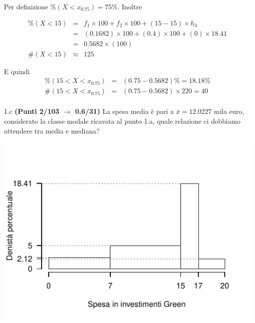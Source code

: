 \documentclass[
  11pt,
]{book}
\theoremstyle{mytheoremstyle}
\theoremstyle{mydefstyle}
\newenvironment{sol}
  {
  \begin{tcolorbox}[enhanced,breakable,arc=0.1mm,boxrule=1pt,colback=white,colframe=iblue,
  title=\bf \fontfamily{lmss}\selectfont \hspace{.5 cm} Soluzione,drop fuzzy shadow]

}{
\end{tcolorbox}
  }
\begin{document}
\begin{sol}
Per definizione \(\%(X<x_{ 0.75 })= 75 \%\). Inoltre

\begin{eqnarray*}
   \%(X< 15 ) &=&  f_{ 1 }\times 100+f_{ 2 }\times 100 +( 15 - 15 )\times h_{ 3 } \\
                &=&  ( 0.1682 )\times 100+( 0.4 )\times 100 +( 0 )\times  18.41  \\
                &=&  0.5682 \times(100) \\
\#(X< 15 )    &\approx& 125 
\end{eqnarray*}

E quindi
\begin{eqnarray*}
   \%( 15 < X < x_{0.75} ) &=& ( 0.75 - 0.5682 )\%= 18.18 \% \\
   \#( 15 < X < x_{0.75} ) &=& ( 0.75 - 0.5682 )\times  220 = 40  \\
\end{eqnarray*}

\end{sol}

1.c \textbf{(Punti 2/103 \(\rightarrow\) 0.6/31)} La spesa media è pari a \(\bar x=12.0227\) mila euro,
considerato la classe modale ricavata al punto 1.a, quale relazione ci dobbiamo attendere tra media e mediana?

\begin{sol}

\begin{center}\includegraphics{Esami_passati_con_soluzioni_files/figure-latex/2022-42-1} \end{center}

\end{sol}
\end{document}

